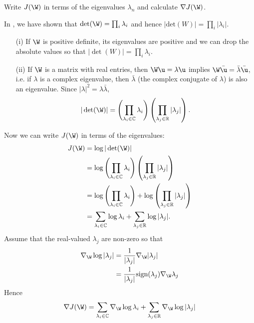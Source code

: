 \begin{exenumerate}
\item Write $J(\W)$ in terms of the eigenvalues $\lambda_n$ and calculate $\nabla J(\mathbf{\W})$.
  \begin{solution}
    In , we have shown that $\det(\W) = \prod_i \lambda_i$ and hence $|\textrm{det}(W)| = \prod_i |\lambda_i|.$
    \begin{enumerate}
    \item[(i)] If $\W$ is positive definite, its eigenvalues are positive and
      we can drop the absolute values so that $|\det(W)| = \prod_i \lambda_i$.
    \item[(ii)] If $\W$ is a matrix with real entries, then $\W\u = \lambda\u$
        implies $\W\bar{\u} = \bar{\lambda}\bar{\u}$, i.e. if $\lambda$ is a
        complex eigenvalue, then $\bar{\lambda}$ (the complex conjugate of
        $\lambda$) is also an eigenvalue. Since $|\lambda|^2 =
        \lambda\bar{\lambda}$,
        \begin{align}
          |\det(\W)| = \left(\prod_{\lambda_i \in \mathbb{C}} \lambda_i \right) \left(\prod_{\lambda_j \in \mathbb{R}} |\lambda_j| \right).
        \end{align}
      \end{enumerate}
      Now we can write $J(\W)$ in terms of the eigenvalues:
      \begin{align}
        J(\W)  &= \log |\det(\W)| \\
               &= \log\left(\prod_{\lambda_i \in \mathbb{C}} \lambda_i \right) \left(\prod_{\lambda_j \in \mathbb{R}} |\lambda_j|\right) \\
               &= \log\left(\prod_{\lambda_i \in \mathbb{C}} \lambda_i \right) + \log\left(\prod_{\lambda_j \in \mathbb{R}} |\lambda_j| \right) \\
               &= \sum_{\lambda_i \in \mathbb{C}} \log \lambda_i + \sum_{\lambda_j \in \mathbb{R}} \log |\lambda_j|.
      \end{align}
      Assume that the real-valued $\lambda_j$ are non-zero so that
      \begin{align}
        \nabla_{\W} \log |\lambda_j| & = \frac{1}{|\lambda_j|} \nabla_{\W} |\lambda_j|\\
                                     & =  \frac{1}{|\lambda_j|} \textrm{sign}(\lambda_j)\nabla_{\W}\lambda_j
      \end{align}
      Hence
      \begin{align}
        \nabla J(\W) &= \sum_{\lambda_i \in \mathbb{C}}  \nabla_{\W}\log \lambda_i + \sum_{\lambda_j \in \mathbb{R}}  \nabla_{\W} \log |\lambda_j|\\ 

\end{align}
\end{solution}
\end{exenumerate}
